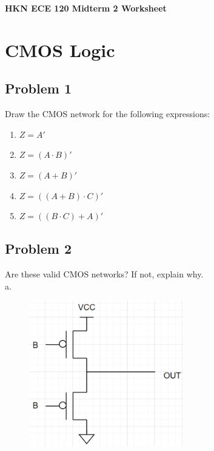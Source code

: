 \documentclass{article}
\begin{document}
\begin{center}
\textbf{
{\Large HKN ECE 120 Midterm 2 Worksheet}
}
\end{center} 
\noindent\makebox[\linewidth]{\rule{\linewidth}{0.2pt}}


\section*{CMOS Logic}
\subsection*{Problem 1}
Draw the CMOS network for the following expressions:
\begin{enumerate}[label=\alph*.]
    \item $ Z = A' $    
    \item $ Z = (A \cdot B)'$
    \item $ Z = (A + B)'$
    \item $ Z = ((A + B) \cdot C)'$
    \item $ Z = ((B \cdot C) + A)'$
\end{enumerate}

\subsection*{Problem 2}
Are these valid CMOS networks? If not, explain why. \\

a.
\begin{figure}[!h]
        \centering
        \includegraphics[width=0.6\textwidth]{figures/CMOS_2a.png}
\end{figure}
\newpage
\end{document}
